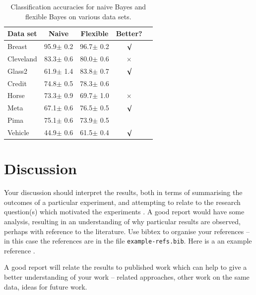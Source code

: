\documentclass{article}
\begin{document}
\begin{table}[tb]
\vskip 3mm
\begin{center}
\begin{small}
\begin{sc}
\begin{tabular}{lcccr}
\hline
\abovespace\belowspace
Data set & Naive & Flexible & Better? \\
\hline
\abovespace
Breast    & 95.9$\pm$ 0.2& 96.7$\pm$ 0.2& $\surd$ \\
Cleveland & 83.3$\pm$ 0.6& 80.0$\pm$ 0.6& $\times$\\
Glass2    & 61.9$\pm$ 1.4& 83.8$\pm$ 0.7& $\surd$ \\
Credit    & 74.8$\pm$ 0.5& 78.3$\pm$ 0.6&         \\
Horse     & 73.3$\pm$ 0.9& 69.7$\pm$ 1.0& $\times$\\
Meta      & 67.1$\pm$ 0.6& 76.5$\pm$ 0.5& $\surd$ \\
Pima      & 75.1$\pm$ 0.6& 73.9$\pm$ 0.5&         \\
\belowspace
Vehicle   & 44.9$\pm$ 0.6& 61.5$\pm$ 0.4& $\surd$ \\
\hline
\end{tabular}
\end{sc}
\end{small}
\caption{Classification accuracies for naive Bayes and flexible 
Bayes on various data sets.}
\label{tab:sample-table}
\end{center}
\vskip -3mm
\end{table}






\section{Discussion}
Your discussion should interpret the results, both in terms of summarising the outcomes of a particular experiment, and attempting to relate to the research question(s) which motivated the experiments . A good report would have some analysis, resulting in an understanding of why particular results are observed, perhaps with reference to the literature. Use bibtex to organise your references -- in this case the references are in the file \verb+example-refs.bib+.  Here is a an example reference \citep{langley00}.  

A good report will relate the results to  published work which can help to give a better understanding of your work -- related approaches, other work on the same data, ideas for future work. 
\end{document}
